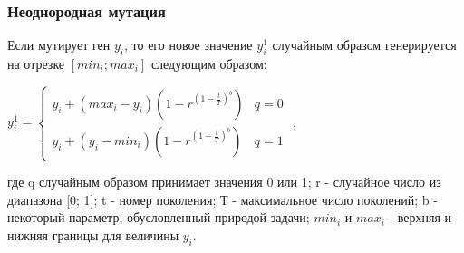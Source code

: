 \subsubsection{Неоднородная мутация}
Если мутирует ген $y_{i}$, то его новое значение $y^{1}_{i}$ случайным образом генерируется на отрезке $[min_{i}; max_{i}]$ следующим образом:

$
y^{1}_{i} = 
\begin{cases}
	\displaystyle y_{i} + \left(max_{i} - y_{i}\right)\left(1 - r^{{\left(\displaystyle1 - \frac{t}{T}\right)}^{b}}\right) &	q = 0 \\
	\displaystyle y_{i} + \left(y_{i} -  min_{i}\right)\left(1 - r^{{\left(\displaystyle 1 - \frac{t}{T}\right)}^{b}}\right) &	q = 1
\end{cases}
$
,

где q случайным образом принимает значения 0 или 1; r - случайное число из диапазона [0; 1]; t - номер поколения; Т - максимальное число поколений; b - некоторый параметр, обусловленный природой задачи; $min_{i}$ и $max_{i}$ - верхняя и нижняя границы для величины $y_{i}$.

